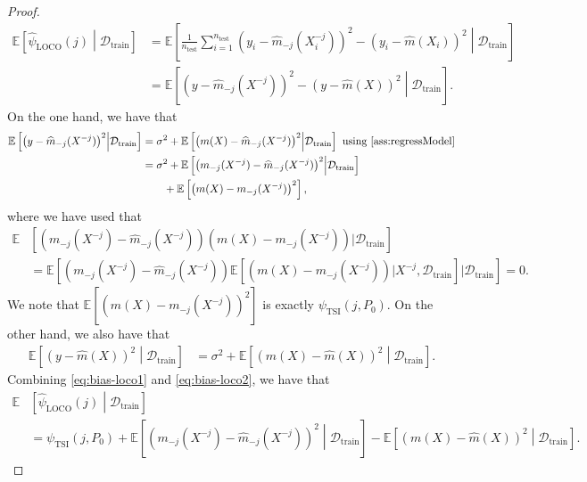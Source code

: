 \documentclass{article}
\theoremstyle{plain}
\theoremstyle{definition}
\theoremstyle{remark}
\newcommand{\e}[1]{\mathbb{E}\left[#1\right]  } %
\begin{document}
 \begin{proof}
     \begin{align*}
         \e{\widehat{\psi}_\mathrm{LOCO}(j)\middle|\mathcal{D}_\mathrm{train}}&= 
         \e{\frac{1}{n_\mathrm{test}}\sum_{i=1}^{n_\mathrm{test}}\left(y_i-\widehat{m}_{-j}(X_i^{-j})\right)^2-\left(y_i-\widehat{m}(X_i)\right)^2\middle|\mathcal{D}_\mathrm{train}}\\
         &=\e{\left(y-\widehat{m}_{-j}(X^{-j})\right)^2-\left(y-\widehat{m}(X)\right)^2\middle|\mathcal{D}_\mathrm{train}}.
     \end{align*}
     On the one hand, we have that 
     \begin{align}
         \e{\left(y-\widehat{m}_{-j}(X^{-j})\right)^2\middle|\mathcal{D}_\mathrm{train}}&= \sigma^2+\e{\left(m(X)-\widehat{m}_{-j}(X^{-j})\right)^2\middle|\mathcal{D}_\mathrm{train}}\text{ using \cref{ass:regressModel}}\notag\\
         &= \sigma^2+\e{\left(m_{-j}(X^{-j})-\widehat{m}_{-j}(X^{-j})\right)^2\middle|\mathcal{D}_\mathrm{train}}\notag\\&\qquad+\e{\left(m(X)-m_{-j}(X^{-j})\right)^2}\label{eq:bias-loco1},
     \end{align}
     where we have used that 
     \begin{align*}
         \mathbb{E}&\left[(m_{-j}(X^{-j})-\widehat{m}_{-j}(X^{-j}))(m(X)-m_{-j}(X^{-j}))|\mathcal{D}_\mathrm{train}\right]\\&=\e{(m_{-j}(X^{-j})-\widehat{m}_{-j}(X^{-j}))\e{(m(X)-m_{-j}(X^{-j}))|X^{-j},\mathcal{D}_\mathrm{train}}|\mathcal{D}_\mathrm{train}}=0.
     \end{align*}
     We note that $\e{\left(m(X)-m_{-j}(X^{-j})\right)^2}$ is exactly $\psi_\mathrm{TSI}(j, P_0)$.
     On the other hand, we also have that
     \begin{align}
         \e{\left(y-\widehat{m}(X)\right)^2\middle|\mathcal{D}_\mathrm{train}}&=\sigma^2+\e{(m(X)-\widehat{m}(X))^2\middle|\mathcal{D}_\mathrm{train}}.\label{eq:bias-loco2}
     \end{align}
     Combining \eqref{eq:bias-loco1} and \eqref{eq:bias-loco2}, we have that 
     \begin{align*}
         \mathbb{E}&\left[\widehat{\psi}_\mathrm{LOCO}(j)\middle|\mathcal{D}_\mathrm{train}\right]\\&= \psi_\mathrm{TSI}(j, P_0) + \e{\left(m_{-j}(X^{-j})-\widehat{m}_{-j}(X^{-j})\right)^2\middle|\mathcal{D}_\mathrm{train}}-\e{(m(X)-\widehat{m}(X))^2\middle|\mathcal{D}_\mathrm{train}}. 
     \end{align*}
 \end{proof}
 
\end{document}
